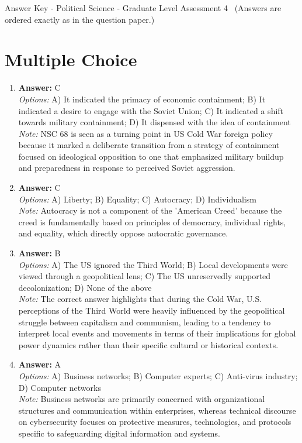 \documentclass[12pt]{article}
\begin{document}
\begin{center}
Answer Key - Political Science - Graduate Level Assessment 4 \
\small (Answers are ordered exactly as in the question paper.)
\end{center}

\section*{Multiple Choice}
\begin{enumerate}[label=\arabic*.]
\item \textbf{Answer:} C
\\ \textit{Options:} A) It indicated the primacy of economic containment; B) It indicated a desire to engage with the Soviet Union; C) It indicated a shift towards military containment; D) It dispensed with the idea of containment
\\ \textit{Note:} NSC 68 is seen as a turning point in US Cold War foreign policy because it marked a deliberate transition from a strategy of containment focused on ideological opposition to one that emphasized military buildup and preparedness in response to perceived Soviet aggression.
\item \textbf{Answer:} C
\\ \textit{Options:} A) Liberty; B) Equality; C) Autocracy; D) Individualism
\\ \textit{Note:} Autocracy is not a component of the 'American Creed' because the creed is fundamentally based on principles of democracy, individual rights, and equality, which directly oppose autocratic governance.
\item \textbf{Answer:} B
\\ \textit{Options:} A) The US ignored the Third World; B) Local developments were viewed through a geopolitical lens; C) The US unreservedly supported decolonization; D) None of the above
\\ \textit{Note:} The correct answer highlights that during the Cold War, U.S. perceptions of the Third World were heavily influenced by the geopolitical struggle between capitalism and communism, leading to a tendency to interpret local events and movements in terms of their implications for global power dynamics rather than their specific cultural or historical contexts.
\item \textbf{Answer:} A
\\ \textit{Options:} A) Business networks; B) Computer experts; C) Anti-virus industry; D) Computer networks
\\ \textit{Note:} Business networks are primarily concerned with organizational structures and communication within enterprises, whereas technical discourse on cybersecurity focuses on protective measures, technologies, and protocols specific to safeguarding digital information and systems.

\end{enumerate}
\end{document}
